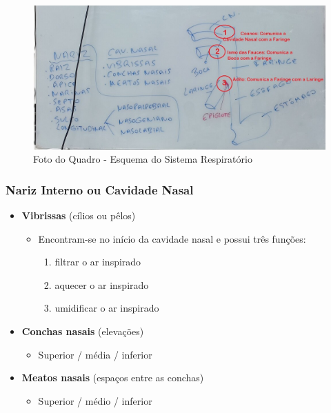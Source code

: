 \documentclass[
]{book}
\providecommand{\tightlist}{%
  \setlength{\itemsep}{0pt}\setlength{\parskip}{0pt}}
\begin{document}
\begin{figure}

{\centering \includegraphics[width=0.9\linewidth]{figuras/Aula8-1-esquema-do-sistema-respiratorio} 

}

\caption{Foto do Quadro - Esquema do Sistema Respiratório}\label{fig:unnamed-chunk-16}
\end{figure}

\hypertarget{nariz-interno-ou-cavidade-nasal}{%
\subsubsection{Nariz Interno ou Cavidade Nasal}\label{nariz-interno-ou-cavidade-nasal}}

\begin{itemize}
\tightlist
\item
  \textbf{Vibrissas} (cílios ou pêlos)

  \begin{itemize}
  \tightlist
  \item
    Encontram-se no início da cavidade nasal e possui três funções:

    \begin{enumerate}
    \def\labelenumi{\arabic{enumi}.}
    \tightlist
    \item
      filtrar o ar inspirado
    \item
      aquecer o ar inspirado
    \item
      umidificar o ar inspirado
    \end{enumerate}
  \end{itemize}
\item
  \textbf{Conchas nasais }(elevações)

  \begin{itemize}
  \tightlist
  \item
    Superior / média / inferior
  \end{itemize}
\item
  \textbf{Meatos nasais} (espaços entre as conchas)

  \begin{itemize}
  \tightlist
  \item
    Superior / médio / inferior
  \end{itemize}
\end{itemize}
\end{document}
